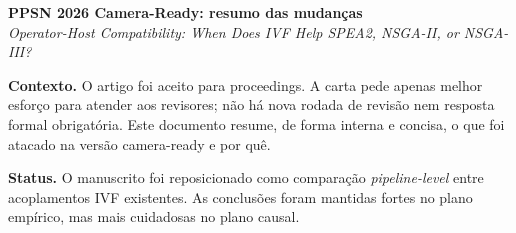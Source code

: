 \documentclass[10pt]{article}
\begin{document}
\begin{center}
{\Large \textbf{PPSN 2026 Camera-Ready: resumo das mudan\c{c}as}}\\
\vspace{2pt}
{\normalsize \textit{Operator-Host Compatibility: When Does IVF Help SPEA2, NSGA-II, or NSGA-III?}}
\end{center}

\textbf{Contexto.} O artigo foi aceito para proceedings. A carta pede apenas
melhor esfor\c{c}o para atender aos revisores; n\~ao h\'a nova rodada de revis\~ao
nem resposta formal obrigat\'oria. Este documento resume, de forma interna e
concisa, o que foi atacado na vers\~ao camera-ready e por qu\^e.

\textbf{Status.} O manuscrito foi reposicionado como compara\c{c}\~ao
\emph{pipeline-level} entre acoplamentos IVF existentes. As conclus\~oes foram
mantidas fortes no plano emp\'irico, mas mais cuidadosas no plano causal.
\end{document}
